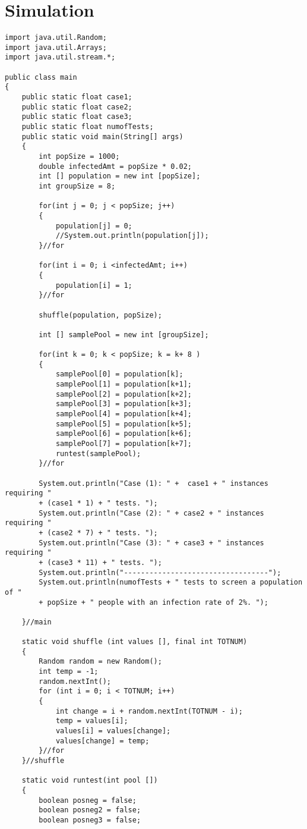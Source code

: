 \documentclass{article}
\begin{document}
\section{Simulation}
\begin{lstlisting}[frame =single,
backgroundcolor = \color{grey!12}]
import java.util.Random;
import java.util.Arrays;
import java.util.stream.*;

public class main 
{
	public static float case1;
	public static float case2;
	public static float case3;
	public static float numofTests;
	public static void main(String[] args) 
	{
		int popSize = 1000; 
		double infectedAmt = popSize * 0.02;
		int [] population = new int [popSize];
		int groupSize = 8;
		
		for(int j = 0; j < popSize; j++)
		{
			population[j] = 0;
			//System.out.println(population[j]);
		}//for
		
		for(int i = 0; i <infectedAmt; i++)
		{
			population[i] = 1; 
		}//for
		
		shuffle(population, popSize);
		
		int [] samplePool = new int [groupSize];
		
		for(int k = 0; k < popSize; k = k+ 8 )
		{
			samplePool[0] = population[k];
			samplePool[1] = population[k+1];
			samplePool[2] = population[k+2];
			samplePool[3] = population[k+3];
			samplePool[4] = population[k+4];
			samplePool[5] = population[k+5];
			samplePool[6] = population[k+6];
			samplePool[7] = population[k+7];
			runtest(samplePool);
		}//for
		
		System.out.println("Case (1): " +  case1 + " instances requiring " 
		+ (case1 * 1) + " tests. ");
		System.out.println("Case (2): " + case2 + " instances requiring " 
		+ (case2 * 7) + " tests. ");
		System.out.println("Case (3): " + case3 + " instances requiring " 
		+ (case3 * 11) + " tests. ");
		System.out.println("----------------------------------");
		System.out.println(numofTests + " tests to screen a population of "
		+ popSize + " people with an infection rate of 2%. ");

	}//main
	
	static void shuffle (int values [], final int TOTNUM)
	{
		Random random = new Random();
		int temp = -1;
		random.nextInt();
		for (int i = 0; i < TOTNUM; i++)
		{
			int change = i + random.nextInt(TOTNUM - i);
			temp = values[i];
	        values[i] = values[change];
	        values[change] = temp;
		}//for
	}//shuffle
	
	static void runtest(int pool [])
	{
		boolean posneg = false;
		boolean posneg2 = false;
		boolean posneg3 = false;
		

\end{lstlisting}
\end{document}
